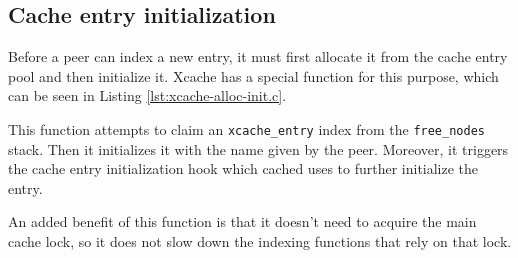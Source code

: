 \begin{comment}
	The rest willwhaLet's start by listing what \texttt{xcache entry} 
	consists of.  First of all, it must have a name.  Since we preallocate 
	the entries and cannot know in runtime their length, we must allocate 
	as much space as possible. The \texttt{char name[XSEG\_MAX\_TARGETLEN + 
		1]} field, which is 256 characters long, is long enough to hold the 
	target's name.  Also, as we have mentioned in Section 
	\ref{sec:entry-prealloc-design}, xcache must be agnostic of the cache 
	contents.  To this end, we use the generic \texttt{void *priv} field as 
	a pointer to the actual entry content.  The rest of the fields will be 
	explained in the following chapters.

	Let's continue now with the fields of Listing \ref{lst:xcache-prealloc.h}.  
	Since we preallocate the entries using \texttt{malloc}, they take up a 
	contiguous space in memory.  The start of this space is the where the 
	\texttt{*nodes} field points to. The \texttt{free\_nodes} field works similarly 
	to the free\_entries field in Section \ref{sec:get-req-archip} i.e. it is a 
	stack where indexes to unused nodes are pushed. These indexes will be seen in 
	various code excerpts in this chapter and have a specific name, 
	\texttt{xcache\_handler}\footnote{\#define xcache\_handler uint64\_t}.
\end{comment}

\subsection{Cache entry initialization}

Before a peer can index a new entry, it must first allocate it from the cache 
entry pool and then initialize it. Xcache has a special function for this 
purpose, which can be seen in Listing \ref{lst:xcache-alloc-init.c}.


This function attempts to claim an \texttt{xcache\_entry} index from the
\texttt{free\_nodes} stack.  Then it initializes it with the name given by the 
peer.  Moreover, it triggers the cache entry initialization hook which cached 
uses to further initialize the entry.

An added benefit of this function is that it doesn't need to acquire the main 
cache lock, so it does not slow down the indexing functions that rely on that 
lock.

